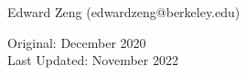 \def\topic{Galois Theory}



    \begin{center}
        \color{blue}
        \textsf{Edward Zeng (edwardzeng@berkeley.edu)}

        \color{red}
        \textsf{Original: December 2020\\}
        \textsf{Last Updated: November 2022}
    \end{center}

    
    
    
    


